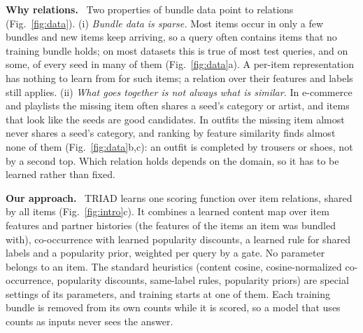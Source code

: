 \documentclass[runningheads]{llncs}
\renewcommand{\paragraph}[1]{\smallskip\noindent\textbf{#1}\ }
\begin{document}
\paragraph{Why relations.} Two properties of bundle data point to relations (Fig.~\ref{fig:data}). (i) \emph{Bundle
data is sparse.} Most items occur in only a few bundles and new items keep arriving, so a query often contains items
that no training bundle holds; on most datasets this is true of most test queries, and on some, of every seed in many
of them (Fig.~\ref{fig:data}a). A per-item representation has nothing to learn from for such items; a relation over
their features and labels still applies. (ii) \emph{What goes together is not always what is similar.} In e-commerce
and playlists the missing item often shares a seed's category or artist, and items that look like the seeds are good
candidates. In outfits the missing item almost never shares a seed's category, and ranking by feature similarity finds
almost none of them (Fig.~\ref{fig:data}b,c): an outfit is completed by trousers or shoes, not by a second top. Which
relation holds depends on the domain, so it has to be learned rather than fixed.

\paragraph{Our approach.} TRIAD learns one scoring function over item relations, shared by all items
(Fig.~\ref{fig:intro}c). It combines a learned content map over item features and partner histories (the features
of the items an item was bundled with), co-occurrence with learned popularity discounts, a learned rule for shared
labels and a popularity prior, weighted per query by a gate. No parameter belongs to an item. The standard heuristics
(content cosine, cosine-normalized co-occurrence, popularity discounts, same-label rules, popularity priors) are
special settings of its parameters, and training starts at one of them. Each training bundle is removed from its own
counts while it is scored, so a model that uses counts as inputs never sees the answer.
\end{document}

